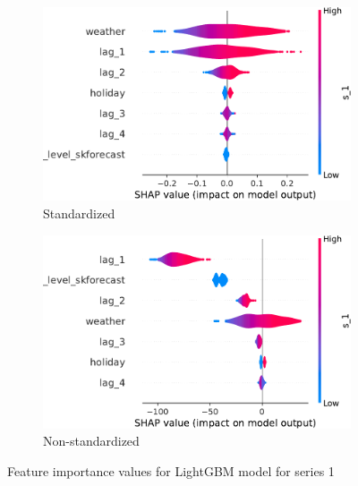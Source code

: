 \begin{figure}
    \centering
    \begin{subfigure}[t]{0.45\textwidth}
        \includegraphics[width=\textwidth]{chapters/04_feature_importance_estimation/img/standardization/lin/lgbm_scaled/shap_violin_s_1}
        \caption{Standardized}
    \end{subfigure}
    \hfill
    \begin{subfigure}[t]{0.45\textwidth}
        \includegraphics[width=\textwidth]{chapters/04_feature_importance_estimation/img/standardization/lin/lgbm_nonscaled/shap_violin_s_1}
        \caption{Non-standardized}
    \end{subfigure}
    \caption{Feature importance values for LightGBM model for series 1}\label{fig:sc_nsc_lgbm_s1}
\end{figure}

